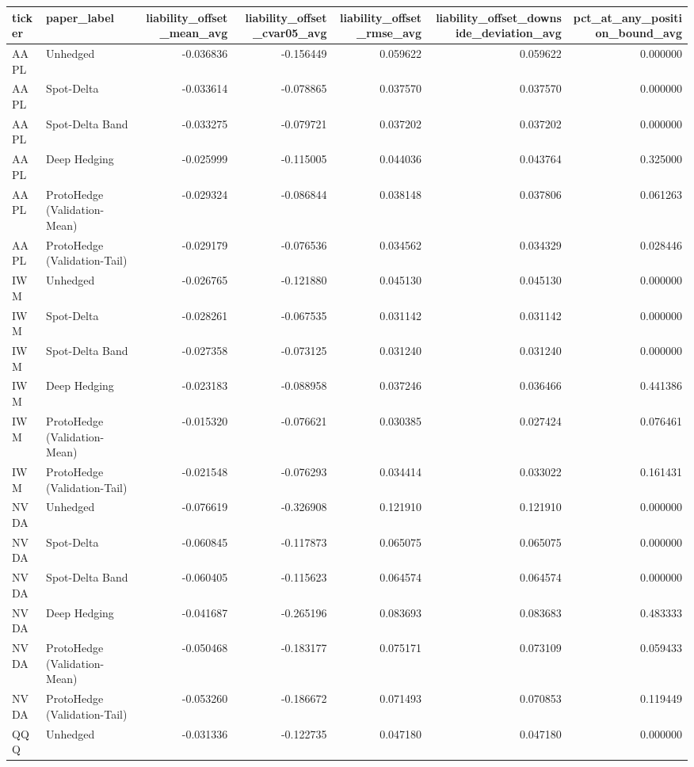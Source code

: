 \begin{tabular}{llrrrrr}
\toprule
ticker & paper\_label & liability\_offset\_mean\_avg & liability\_offset\_cvar05\_avg & liability\_offset\_rmse\_avg & liability\_offset\_downside\_deviation\_avg & pct\_at\_any\_position\_bound\_avg \\
\midrule
AAPL & Unhedged & -0.036836 & -0.156449 & 0.059622 & 0.059622 & 0.000000 \\
AAPL & Spot-Delta & -0.033614 & -0.078865 & 0.037570 & 0.037570 & 0.000000 \\
AAPL & Spot-Delta Band & -0.033275 & -0.079721 & 0.037202 & 0.037202 & 0.000000 \\
AAPL & Deep Hedging & -0.025999 & -0.115005 & 0.044036 & 0.043764 & 0.325000 \\
AAPL & ProtoHedge (Validation-Mean) & -0.029324 & -0.086844 & 0.038148 & 0.037806 & 0.061263 \\
AAPL & ProtoHedge (Validation-Tail) & -0.029179 & -0.076536 & 0.034562 & 0.034329 & 0.028446 \\
IWM & Unhedged & -0.026765 & -0.121880 & 0.045130 & 0.045130 & 0.000000 \\
IWM & Spot-Delta & -0.028261 & -0.067535 & 0.031142 & 0.031142 & 0.000000 \\
IWM & Spot-Delta Band & -0.027358 & -0.073125 & 0.031240 & 0.031240 & 0.000000 \\
IWM & Deep Hedging & -0.023183 & -0.088958 & 0.037246 & 0.036466 & 0.441386 \\
IWM & ProtoHedge (Validation-Mean) & -0.015320 & -0.076621 & 0.030385 & 0.027424 & 0.076461 \\
IWM & ProtoHedge (Validation-Tail) & -0.021548 & -0.076293 & 0.034414 & 0.033022 & 0.161431 \\
NVDA & Unhedged & -0.076619 & -0.326908 & 0.121910 & 0.121910 & 0.000000 \\
NVDA & Spot-Delta & -0.060845 & -0.117873 & 0.065075 & 0.065075 & 0.000000 \\
NVDA & Spot-Delta Band & -0.060405 & -0.115623 & 0.064574 & 0.064574 & 0.000000 \\
NVDA & Deep Hedging & -0.041687 & -0.265196 & 0.083693 & 0.083683 & 0.483333 \\
NVDA & ProtoHedge (Validation-Mean) & -0.050468 & -0.183177 & 0.075171 & 0.073109 & 0.059433 \\
NVDA & ProtoHedge (Validation-Tail) & -0.053260 & -0.186672 & 0.071493 & 0.070853 & 0.119449 \\
QQQ & Unhedged & -0.031336 & -0.122735 & 0.047180 & 0.047180 & 0.000000 \\

\end{tabular}
